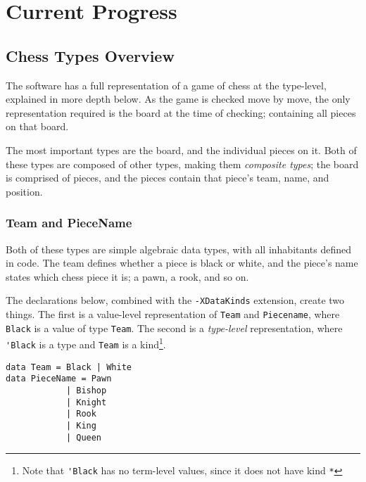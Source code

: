 \documentclass[12pt, a4paper]{scrartcl}
\begin{document}
\section{Current Progress}

\subsection{Chess Types Overview}

The software has a full representation of a game of chess at the type-level, explained in more depth below. As the game is checked move by move, the only representation required is the board at the time of checking; containing all pieces on that board.

The most important types are the board, and the individual pieces on it. Both of these types are composed of other types, making them \emph{composite types}; the board is comprised of pieces, and the pieces contain that piece's team, name, and position.

\subsubsection{Team and PieceName}

Both of these types are simple algebraic data types, with all inhabitants defined in code. The team defines whether a piece is black or white, and the piece's name states which chess piece it is; a pawn, a rook, and so on.

The declarations below, combined with the \lstinline{-XDataKinds} extension, create two things. The first is a value-level representation of \lstinline{Team} and \lstinline{Piecename}, where \lstinline{Black} is a value of type \lstinline{Team}. The second is a \emph{type-level} representation, where \lstinline{'Black} is a type and \lstinline{Team} is a kind\footnote{Note that \lstinline{'Black} has no term-level values, since it does not have kind \lstinline{*}}.


\begin{lstlisting}
data Team = Black | White
data PieceName = Pawn
            | Bishop
            | Knight
            | Rook
            | King
            | Queen
\end{lstlisting}
\end{document}
